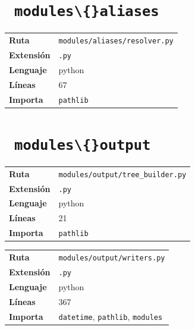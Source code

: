 \documentclass[12pt, a4paper]{report}
\begin{document}
\medskip

\section{\ \texttt{modules\textbackslash\{\}aliases}}

\begin{fichabox}
\small
\begin{tabular}{@{}ll@{}}
  \textbf{Ruta} & \texttt{modules/aliases/resolver.py} \\
  \textbf{Extensión} & \texttt{.py} \\
  \textbf{Lenguaje} & python \\
  \textbf{Líneas} & 67 \\
  \textbf{Importa} & \parbox[t]{10cm}{\texttt{pathlib}} \\
\end{tabular}
\end{fichabox}

\medskip

\section{\ \texttt{modules\textbackslash\{\}output}}

\begin{fichabox}
\small
\begin{tabular}{@{}ll@{}}
  \textbf{Ruta} & \texttt{modules/output/tree\_builder.py} \\
  \textbf{Extensión} & \texttt{.py} \\
  \textbf{Lenguaje} & python \\
  \textbf{Líneas} & 21 \\
  \textbf{Importa} & \parbox[t]{10cm}{\texttt{pathlib}} \\
\end{tabular}
\end{fichabox}

\medskip

\begin{fichabox}
\small
\begin{tabular}{@{}ll@{}}
  \textbf{Ruta} & \texttt{modules/output/writers.py} \\
  \textbf{Extensión} & \texttt{.py} \\
  \textbf{Lenguaje} & python \\
  \textbf{Líneas} & 367 \\
  \textbf{Importa} & \parbox[t]{10cm}{\texttt{datetime}, \texttt{pathlib}, \texttt{modules}} \\
\end{tabular}
\end{fichabox}
\end{document}
